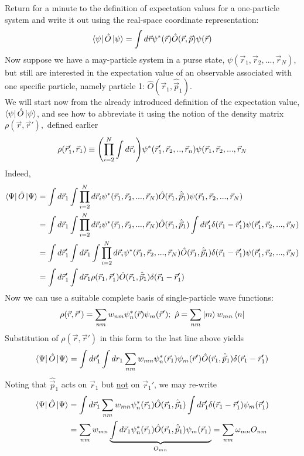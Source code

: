\documentclass[10pt]{article}
\newcommand{\vecop}[1]{\hat{\vec{#1}}}
\begin{document}
Return for a minute to the definition of expectation values for a one-particle system and write it out using the real-space coordinate representation:
$$
\bra{\psi}\hat O \ket{\psi} = \int d\vec r \psi^\ast(\vec r) \hat O(\vec r, \vec p)\psi(\vec r)
$$
Now suppose we have a may-particle system in a purse state, $\psi(\vec r_1, \vec r_2, ..., \vec r_N)$, but still are interested in the expectation value of an observable associated with one specific particle, namely particle 1: $\hat O(\vec r_1, \hat{\vec p}_1)$.  \\
We will start now from the already introduced definition of the expectation value, $\bra{\psi}\hat O \ket{\psi}$, and see how to abbreviate it using the notion of the density matrix $\rho(\vec r, \vec r'),$ defined earlier
$$
\rho(\vec r_1', \vec r_1) \equiv \qty(\prod_{i=2}^N \int d\vec r_i)\psi^\ast(\vec r_1', \vec r_2, .., \vec r_n)\psi(\vec r_1, \vec r_2, ..., \vec r_N
$$
Indeed,
\begin{align*}
    \bra{\Psi}\hat O \ket{\Psi} &= \int d \vec r_1 \int \prod_{i=2}^N d \vec r_i \psi^\ast(\vec r_1, \vec r_2, ..., \vec r_N)\hat O(\vec r_1, \vecop p_1)\psi(\vec r_1, \vec r_2, ..., \vec r_N)\\
                                &= \int d \vec r_1 \int \prod_{i=2}^N d \vec r_i \psi^\ast(\vec r_1, \vec r_2, ..., \vec r_N)\hat O(\vec r_1, \vecop p_1)\int d\vec r'_1\delta(\vec r_1-\vec r_1')\psi(\vec r_1', \vec r_2, ..., \vec r_N)\\
                                &= \int d \vec r_1' \int d \vec r_1 \int \prod_{i=2}^N d \vec r_i \psi^\ast(\vec r_1, \vec r_2, ..., \vec r_N)\hat O(\vec r_1,\vecop p_1)\delta(\vec r_1-\vec r_1')\psi(\vec r_1', \vec r_2, ..., \vec r_N)\\
                                &= \int d\vec r_1' \int d\vec r_1 \rho(\vec r_1, \vec r_1')\hat O(\vec r_1, \vecop{p}_1)\delta(\vec r_1-\vec r_1')
\end{align*}
Now we can use a suitable complete basis of single-particle wave functions:
$$
\rho(\vec r, \vec r')  = \sum_{nm} w_{nm}\psi_n^\ast(\vec r) \psi_m(\vec r'); \ \hat \rho = \sum_{nm} \ket{m} w_{mn} \bra{n}
$$
Substitution of $\rho(\vec r, \vec r')$ in this form to the last line above yields
$$
\bra{\Psi}\hat O \ket{\Psi} = \int d \vec r_1' \int d r_1 \sum_{nm} w_{mn} \psi^\ast_n(\vec r_1) \psi_m(\vec r') \hat O (\vec r_1, \vecop p_1) \delta(\vec r_1 - \vec r_1')
$$
Noting that $\vecop p_1$ acts on $\vec r_1$ but \ul{not} on $\vec r_1'$, we may re-write
\begin{align*}
    \bra{\Psi}\hat O \ket{\Psi} &= \int d\vec r_1 \sum_{nm} w_{mn} \psi_n^\ast(\vec r_1)\hat O(\vec r_1, \vecop p_1) \int d\vec r_1' \delta(\vec r_1-\vec r_1') \psi_m(\vec r_1')\\
                                &= \sum_{nm}w_{mn}\underbrace{\int d\vec r_1 \psi^\ast _n(\vec r_1) \hat O(\vec r_1, \vecop p_1) \psi_m(\vec r_1)}_{O_{mn}} = \sum_{nm}\omega_{mn}O_{nm}
\end{align*}
\end{document}

